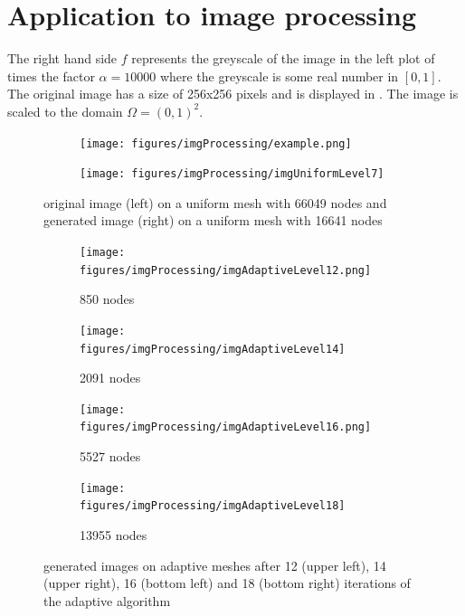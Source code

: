 \documentclass[11p]{article}
\begin{document}
	\section{Application to image processing}
	The right hand side $f$ represents the greyscale of the image in the left plot of times the factor $\alpha = 10000$ where the greyscale is some real number in $[0,1]$. The original image has a size of 256x256 pixels and is displayed  in . The image is scaled to the domain $\Omega = (0,1)^2$.
	
	\begin{figure}[H]
		\centering
		\begin{subfigure}{0.45\linewidth}
			\texttt{[image: figures/imgProcessing/example.png]}
		\end{subfigure}\quad
		\begin{subfigure}{0.45\linewidth}
			\texttt{[image: figures/imgProcessing/imgUniformLevel7]}
		\end{subfigure}
		\caption{original image (left) on a uniform mesh with 66049 nodes and generated image (right) on a uniform mesh with 16641 nodes}
	\end{figure}

	\begin{figure}[H]
		\centering
		\begin{subfigure}{0.45\linewidth}
			\texttt{[image: figures/imgProcessing/imgAdaptiveLevel12.png]}
			\caption{850 nodes}
		\end{subfigure}\quad
		\begin{subfigure}{0.45\linewidth}
			\texttt{[image: figures/imgProcessing/imgAdaptiveLevel14]}
			\caption{2091 nodes}
		\end{subfigure}\vspace{1em}
		
		\begin{subfigure}{0.45\linewidth}
			\texttt{[image: figures/imgProcessing/imgAdaptiveLevel16.png]}
			\caption{5527 nodes}
		\end{subfigure}\quad
		\begin{subfigure}{0.45\linewidth}
			\texttt{[image: figures/imgProcessing/imgAdaptiveLevel18]}
			\caption{13955 nodes}
		\end{subfigure}
		\caption{generated images on adaptive meshes after 12 (upper left), 14 (upper right), 16 (bottom left) and 18 (bottom right) iterations of the adaptive algorithm}
	\end{figure}
\end{document}
